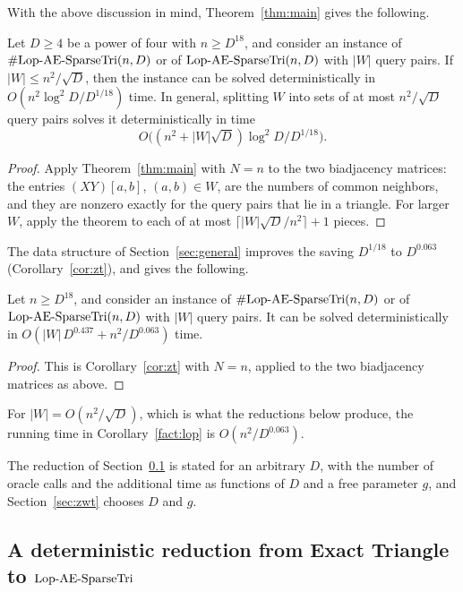 With the above discussion in mind, Theorem~\ref{thm:main} gives the following.

\begin{corollary}\label{fact:lopmain}
Let $D\ge4$ be a power of four with $n\ge D^{18}$, and consider an instance of $\#\mathrm{Lop}\text{-}\mathrm{AE}\text{-}\mathrm{SparseTri}(n,D)$ or of $\mathrm{Lop}\text{-}\mathrm{AE}\text{-}\mathrm{SparseTri}(n,D)$ with $|W|$ query pairs. If $|W|\le n^2/\sqrt D$, then the instance can be solved deterministically in $O(n^2\log^2\!D/D^{1/18})$ time. In general, splitting $W$ into sets of at most $n^2/\sqrt D$ query pairs solves it deterministically in time
\[
O\big((n^2+|W|\sqrt D)\log^2\!D/D^{1/18}\big).
\]
\end{corollary}
\begin{proof}
Apply Theorem~\ref{thm:main} with $N=n$ to the two biadjacency matrices: the entries $(XY)[a,b]$, $(a,b)\in W$, are the numbers of common neighbors, and they are nonzero exactly for the query pairs that lie in a triangle. For larger $W$, apply the theorem to each of at most $\lceil|W|\sqrt D/n^2\rceil+1$ pieces.
\end{proof}

The data structure of Section~\ref{sec:general} improves the saving $D^{1/18}$ to $D^{0.063}$ (Corollary~\ref{cor:zt}), and gives the following.

\begin{corollary}\label{fact:lop}
Let $n\ge D^{18}$, and consider an instance of $\#\mathrm{Lop}\text{-}\mathrm{AE}\text{-}\mathrm{SparseTri}(n,D)$ or of $\mathrm{Lop}\text{-}\mathrm{AE}\text{-}\mathrm{SparseTri}(n,D)$ with $|W|$ query pairs. It can be solved deterministically in $O(|W|\,D^{0.437}+n^2/D^{0.063})$ time. 
\end{corollary}
\begin{proof}
This is Corollary~\ref{cor:zt} with $N=n$, applied to the two biadjacency matrices as above.
\end{proof}

For $|W|=O(n^2/\sqrt D)$, which is what the reductions below produce, the running time in Corollary~\ref{fact:lop} is $O(n^2/D^{0.063})$.

The reduction of Section~\ref{sec:redproof} is stated for an arbitrary $D$, with the number of oracle calls and the additional time as functions of $D$ and a free parameter $g$, and Section~\ref{sec:zwt} chooses $D$ and $g$.

\subsection{A deterministic reduction from Exact Triangle to \texorpdfstring{{\boldmath$\mathrm{Lop}\text{-}\mathrm{AE}\text{-}\mathrm{SparseTri}$}}{Lop}}\label{sec:redproof}

